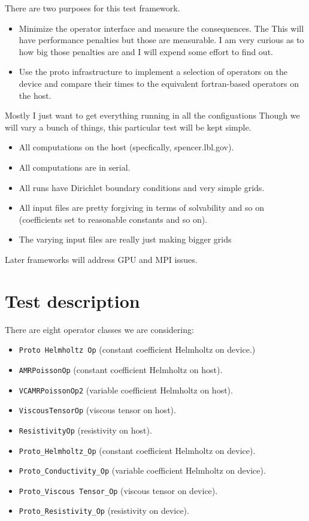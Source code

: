 \documentclass{article}
\begin{document}
There are two purposes for this test framework.
\begin{itemize}
\item Minimize the operator interface and measure the consequences.
  The This will have performance
  penalties but those are measurable.   I am very curious as to how
  big those penalties are and I will expend some effort to find out.
\item Use the proto infrastructure to implement a selection of
  operators on the device and compare their times to the equivalent
  fortran-based operators on the host.
\end{itemize}
Mostly I just want to get everything running in all the configuations
Though we will vary a bunch of things, this particular test will be
kept simple.
\begin{itemize}
  \item All computations on the host (specfically, spencer.lbl.gov).
  \item All computations are in serial.
  \item All runs have Dirichlet boundary conditions and very simple
    grids.
  \item All input files are pretty forgiving in terms of solvability
    and so on (coefficients set to reasonable constants and so on).
  \item The varying input files are really just making bigger grids
\end{itemize}
 Later frameworks will address GPU and MPI issues.

 \section{Test description}

 There are eight operator classes we are considering:
 \begin{itemize}
 \item {\tt Proto Helmholtz Op} (constant coefficient Helmholtz on
   device.)
 \item {\tt AMRPoissonOp} (constant coefficient Helmholtz on   host).
 \item {\tt VCAMRPoissonOp2} (variable coefficient Helmholtz on host).
 \item {\tt ViscousTensorOp} (viscous tensor on host).
 \item {\tt ResistivityOp} (resistivity on host).
 \item {\tt Proto\_Helmholtz\_Op} (constant coefficient Helmholtz on device).
 \item {\tt Proto\_Conductivity\_Op} (variable coefficient Helmholtz on device).
 \item {\tt Proto\_Viscous Tensor\_Op} (viscous tensor on device).
 \item {\tt Proto\_Resistivity\_Op} (resistivity on device).
 \end{itemize}
\end{document}
